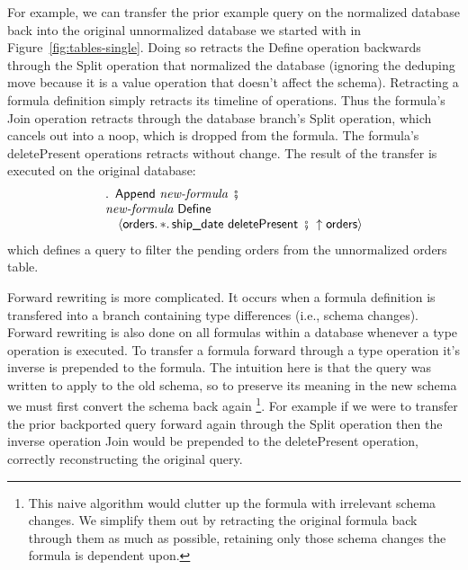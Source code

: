 \documentclass[english,submission]{programming}
\theoremstyle{definition}
\DeclareMathOperator{\exec}{\ \fatsemi\ \ }
\begin{document}
For example, we can transfer the prior example query on the normalized database back into the original unnormalized database we started with in Figure~\ref{fig:tables-single}. Doing so retracts the \textsf{Define} operation backwards through the \textsf{Split} operation that normalized the database (ignoring the deduping \textsf{move} because it is a value operation that doesn't affect the schema). Retracting a formula definition simply retracts its timeline of operations. Thus the formula's \textsf{Join} operation retracts through the database branch's \textsf{Split} operation, which cancels out into a \textsf{noop}, which is dropped from the formula. The formula's \textsf{deletePresent} operations retracts without change. The result of the transfer is executed on the original database:
\[
\begin{array}{l}
  \ldotp \textsf{ Append } \textit{new-formula} \exec\\
  \textit{new-formula} \textsf{ Define } \\
  \quad \langle
\textsf{orders}\ldotp * \ldotp \textsf{ship\_date deletePresent} \exec
\!\!\uparrow \textsf{orders}
  \rangle\\
\end{array}
\]
which defines a query to filter the pending orders from the unnormalized orders table.

Forward rewriting is more complicated. It occurs when a formula definition is transfered into a branch containing type differences (i.e., schema changes). Forward rewriting is also done on all formulas within a database whenever a type operation is executed. To transfer a formula forward through a type operation it's inverse is prepended to the formula. The intuition here is that the query was written to apply to the old schema, so to preserve its meaning in the new schema we must first convert the schema back again
\footnote{This naive algorithm would clutter up the formula with irrelevant schema changes. We simplify them out by retracting the original formula back through them as much as possible, retaining only those schema changes the formula is dependent upon.}.
For example if we were to transfer the prior backported query forward again through the \textsf{Split} operation then the inverse operation \textsf{Join} would be prepended to the \textsf{deletePresent} operation, correctly reconstructing the original query.


\end{document}
